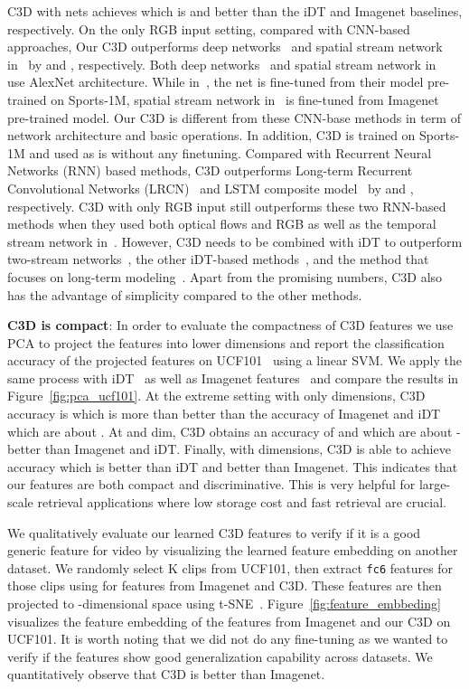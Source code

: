 \documentclass[10pt,twocolumn,letterpaper]{article}
\begin{document}
C3D with  nets achieves  which is  and  better than the iDT and Imagenet baselines, respectively. On the only RGB input setting, compared with CNN-based approaches, Our C3D outperforms deep networks~\cite{Karpathy14} and spatial stream network in~\cite{SimonyanZ14} by  and , respectively. Both deep networks~\cite{Karpathy14} and spatial stream network in~\cite{SimonyanZ14} use AlexNet architecture. While in~\cite{Karpathy14}, the net is fine-tuned from their model pre-trained on Sports-1M, spatial stream network in~\cite{SimonyanZ14} is fine-tuned from Imagenet pre-trained model. Our C3D is different from these CNN-base methods in term of network architecture and basic operations. In addition, C3D is trained on Sports-1M and used as is without any finetuning. Compared with Recurrent Neural Networks (RNN) based methods, C3D outperforms Long-term Recurrent Convolutional Networks (LRCN)~\cite{DonahueHGRVSD14} and LSTM composite model~\cite{SrivastavaMS15} by  and , respectively. C3D with only RGB input still outperforms these two RNN-based methods when they used both optical flows and RGB as well as the temporal stream network in~\cite{SimonyanZ14}. However, C3D needs to be combined with iDT to outperform two-stream networks~\cite{SimonyanZ14}, the other iDT-based methods~\cite{PengWWQ14,LanLLHR14}, and the method that focuses on long-term modeling~\cite{Ng15}. Apart from the promising numbers, C3D also has the advantage of simplicity compared to the other methods.


{\bf C3D is compact}: In order to evaluate the compactness of C3D features we use PCA to project the features into lower dimensions and report the classification accuracy of the projected features on UCF101~\cite{UCF101} using a linear SVM. We apply the same process with iDT~\cite{Wang2013} as well as Imagenet features~\cite{Donahue13} and compare the results in Figure~\ref{fig:pca_ucf101}. At the extreme setting with only  dimensions, C3D accuracy is  which is more than  better than the accuracy of Imagenet and iDT which are about . At  and  dim, C3D obtains an accuracy of  and  which are about - better than Imagenet and iDT. Finally, with  dimensions, C3D is able to achieve  accuracy which is  better than iDT and  better than Imagenet. This indicates that our features are both compact and discriminative. This is very helpful for large-scale retrieval applications where low storage cost and fast retrieval are crucial.


We qualitatively evaluate our learned C3D features to verify if it is a good generic feature for video by visualizing the learned feature embedding on another dataset. We randomly select K clips from UCF101, then extract \texttt{fc6} features for those clips using for features from Imagenet and C3D. These features are then projected to -dimensional space using t-SNE~\cite{van2008visualizing}. Figure~\ref{fig:feature_embbeding} visualizes the feature embedding of the features from Imagenet and our C3D on UCF101. It is worth noting that we did not do any fine-tuning as we wanted to verify if the features show good generalization capability across datasets. We quantitatively observe that C3D is better than Imagenet. 
\end{document}
